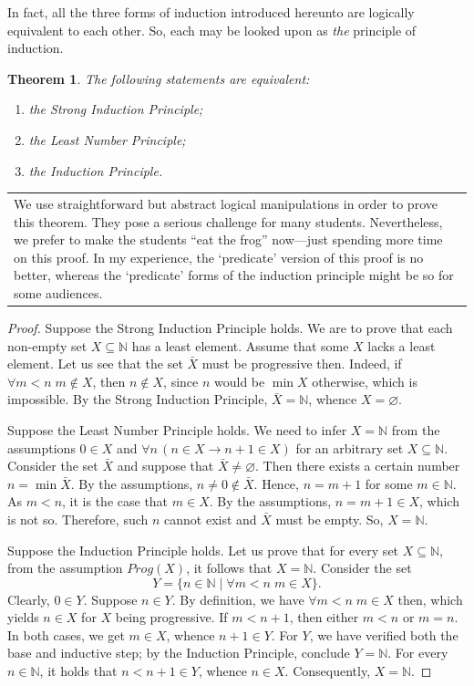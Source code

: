 \documentclass[12pt,notitlepage]{article}
\theoremstyle{plain}
\newtheorem{thm}{Theorem}[section]
\theoremstyle{definition}
\theoremstyle{plain}
\newcommand{\N}{\mathbb{N}}
\newcommand{\sbs}{\subseteq}
\newcommand{\void}{\varnothing}
\newcommand{\1}{\mathbf{1}}
\newcommand{\0}{\mathbf{0}}
\newcommand{\mcomm}[1]{
\medskip\noindent\begin{tabular}{| l}
\parbox{0.99\textwidth}{{\small
#1 }}\end{tabular}
\smallskip}
\begin{document}
In fact, all the three forms of induction introduced hereunto are logically equivalent to each other. So, each may be looked upon as \emph{the} principle of induction.
\begin{thm}
The following statements are equivalent:
\begin{enumerate}
\item the Strong Induction Principle;
\item the Least Number Principle;
\item the Induction Principle.
\end{enumerate}
\end{thm}
\mcomm{We use straightforward but abstract logical manipulations in order to prove this theorem. They pose a serious challenge for many students. Nevertheless, we prefer to make the students ``eat the frog'' now---just spending more time on this proof. In my experience, the `predicate' version of this proof is no better, whereas the `predicate' forms of the induction principle might be so for some audiences.}
\begin{proof}
Suppose the Strong Induction Principle holds. We are to prove that each non-empty set $X \sbs \N$ has a least element. Assume that some $X$ lacks a least element. Let us see that the set $\bar X$ must be progressive then. Indeed, if $\forall m < n\; m \notin X$, then $n \notin X$, since $n$ would be $\min X$ otherwise, which is impossible. By the Strong Induction Principle, $\bar X = \N$, whence $X = \void$.

Suppose the Least Number Principle holds. We need to infer $X = \N$ from the assumptions $0 \in X$ and $\forall n\, (n \in X \to n+1 \in X)$ for an arbitrary set $X \sbs \N$. Consider the set $\bar X$ and suppose that $\bar X \neq \void$. Then there exists a certain number $n = \min \bar X$. By the assumptions, $n \neq 0 \notin \bar X$. Hence, $n = m + 1$ for some $m \in \N$. As $m < n$, it is the case that $m \in X$. By the assumptions, $n = m + 1  \in X$, which is not so. Therefore, such $n$ cannot exist and $\bar X$ must be empty. So, $X = \N$.

Suppose the Induction Principle holds. Let us prove that for every set $X \sbs \N$, from the assumption $Prog(X)$, it follows that $X =\N$. Consider the set
$$Y = \{ n \in \N \mid \forall m < n\; m \in X \}.$$
Clearly, $0 \in Y$. Suppose $n \in Y$. By definition, we have $\forall m < n\; m \in X$ then, which yields $n \in X$ for $X$ being progressive. If $m < n + 1$, then either $m < n$ or $m = n$. In both cases, we get $m \in X$, whence $n + 1\in Y$. For $Y$, we have verified both the base and inductive step; by the Induction Principle, conclude $Y = \N$. For every $n \in \N$, it holds that $n < n + 1 \in Y$, whence $n \in X$. Consequently, $X = \N$.
\end{proof}
\end{document}

